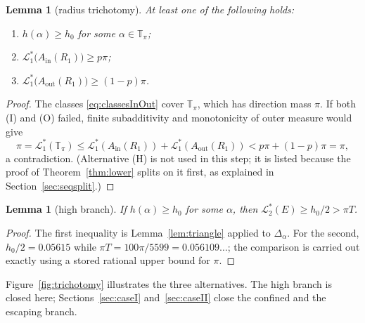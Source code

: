 \documentclass[11pt]{article}
\theoremstyle{plain}
\newtheorem{lemma}[theorem]{Lemma}
\theoremstyle{definition}
\theoremstyle{remark}
\newcommand{\Tp}{\mathbb{T}_{\pi}}
\newcommand{\Lout}{\mathcal{L}^{*}_{2}}
\newcommand{\Lone}{\mathcal{L}^{*}_{1}}
\newcommand{\Ain}{A_{\mathrm{in}}}
\newcommand{\Aout}{A_{\mathrm{out}}}
\begin{document}
\begin{lemma}[radius trichotomy]\label{lem:trichotomy}
At least one of the following holds:
\begin{enumerate}
  \item[\textup{(H)}] $h(\alpha)\ge h_{0}$ for some $\alpha\in\Tp$;
  \item[\textup{(I)}] $\Lone\bigl(\Ain(R_{1})\bigr)\ge p\pi$;
  \item[\textup{(O)}] $\Lone\bigl(\Aout(R_{1})\bigr)\ge(1-p)\pi$.
\end{enumerate}
\end{lemma}

\begin{proof}
The classes \eqref{eq:classesInOut} cover $\Tp$, which has direction mass $\pi$.
If both (I) and (O) failed, finite subadditivity and monotonicity of outer
measure would give
\[
  \pi=\Lone(\Tp)\le\Lone(\Ain(R_{1}))+\Lone(\Aout(R_{1}))<p\pi+(1-p)\pi=\pi,
\]
a contradiction. (Alternative (H) is not used in this step; it is listed because
the proof of Theorem~\ref{thm:lower} splits on it first, as explained in
Section~\ref{sec:seqsplit}.)
\end{proof}

\begin{lemma}[high branch]\label{lem:high}
If $h(\alpha)\ge h_{0}$ for some $\alpha$, then $\Lout(E)\ge h_{0}/2>\pi T$.
\end{lemma}

\begin{proof}
The first inequality is Lemma~\ref{lem:triangle} applied to $\Delta_{\alpha}$.
For the second, $h_{0}/2=0.05615$ while
$\pi T=100\pi/5599=0.056109\ldots$; the comparison is carried out exactly using
a stored rational upper bound for $\pi$.
\end{proof}

Figure~\ref{fig:trichotomy} illustrates the three alternatives. The high branch
is closed here; Sections~\ref{sec:caseI} and~\ref{sec:caseII} close the confined
and the escaping branch.
\end{document}
